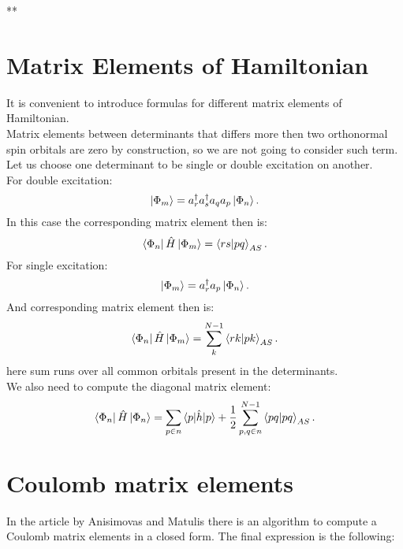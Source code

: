 \documentclass[twoside,english]{uiofysmaster}
\theoremstyle{definition}
\begin{document}
\clearpage
**\appendix
\chapter{Matrix Elements of Hamiltonian}\label{app:1}
It is convenient to introduce formulas for different matrix elements of Hamiltonian. \\
Matrix elements between determinants that differs more then two orthonormal spin orbitals are zero by construction, so we are not going to consider such term.\\
Let us choose one determinant to be single or double excitation on another. \\
For double excitation:
\begin{equation}
\ket{\Phi_{m}}=a^\dagger_r a^\dagger_s a_q a_p \ket{\Phi_n}.
\end{equation}
In this case the corresponding matrix element then is:
\begin{equation}
\bra{\Phi_n} \hat{H}\ket{\Phi_{m}}=\braket{rs|pq}_{AS}.
\end{equation}
For single excitation:
\begin{equation}
\ket{\Phi_{m}}=a^\dagger_r  a_p \ket{\Phi_n}.
\end{equation}
And corresponding matrix element then is:
\begin{equation}
\bra{\Phi_n} \hat{H}\ket{\Phi_{m}}=\sum_{k}^{N-1}\braket{rk|pk}_{AS}.
\end{equation}
here sum runs over all common orbitals present in the determinants.\\
We also need to compute the diagonal matrix element:
\begin{equation}
\bra{\Phi_n} \hat{H}\ket{\Phi_{n}}=\sum_{p\in n} \braket{p|\hat{h}|p} + \frac{1}{2} \sum_{p,q \in n}^{N-1}\braket{pq|pq}_{AS}.
\end{equation}

\chapter{Coulomb matrix elements}\label{app:2}
In the article by Anisimovas and Matulis \cite{anisimovasEnergySpectraFewelectron1998} there is an algorithm to compute a Coulomb matrix elements in a closed form. The final expression is the following:
\end{document}
